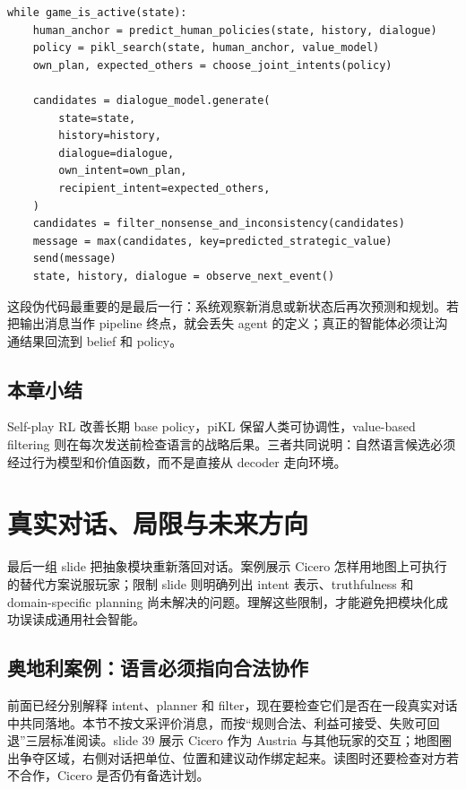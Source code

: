 \documentclass[a4paper]{article}
\begin{document}
\begin{lstlisting}[caption={Cicero-style strategic dialogue closed loop},label={lst:cicero-loop}]
while game_is_active(state):
    human_anchor = predict_human_policies(state, history, dialogue)
    policy = pikl_search(state, human_anchor, value_model)
    own_plan, expected_others = choose_joint_intents(policy)

    candidates = dialogue_model.generate(
        state=state,
        history=history,
        dialogue=dialogue,
        own_intent=own_plan,
        recipient_intent=expected_others,
    )
    candidates = filter_nonsense_and_inconsistency(candidates)
    message = max(candidates, key=predicted_strategic_value)
    send(message)
    state, history, dialogue = observe_next_event()
\end{lstlisting}

这段伪代码最重要的是最后一行：系统观察新消息或新状态后再次预测和规划。若把输出消息当作 pipeline 终点，就会丢失 agent 的定义；真正的智能体必须让沟通结果回流到 belief 和 policy。

\subsection{本章小结}

Self-play RL 改善长期 base policy，piKL 保留人类可协调性，value-based filtering 则在每次发送前检查语言的战略后果。三者共同说明：自然语言候选必须经过行为模型和价值函数，而不是直接从 decoder 走向环境。

\section{真实对话、局限与未来方向}

最后一组 slide 把抽象模块重新落回对话。案例展示 Cicero 怎样用地图上可执行的替代方案说服玩家；限制 slide 则明确列出 intent 表示、truthfulness 和 domain-specific planning 尚未解决的问题。理解这些限制，才能避免把模块化成功误读成通用社会智能。

\subsection{奥地利案例：语言必须指向合法协作}

前面已经分别解释 intent、planner 和 filter，现在要检查它们是否在一段真实对话中共同落地。本节不按文采评价消息，而按“规则合法、利益可接受、失败可回退”三层标准阅读。slide 39 展示 Cicero 作为 Austria 与其他玩家的交互；地图圈出争夺区域，右侧对话把单位、位置和建议动作绑定起来。读图时还要检查对方若不合作，Cicero 是否仍有备选计划。
\end{document}
